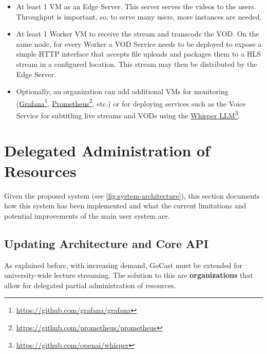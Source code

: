 \begin{itemize}
    \item At least 1 \ac{VM} as an Edge Server. This server serves the videos to the users. Throughput is important, so, to serve many users, more instances are needed.
    \item At least 1 Worker \ac{VM} to receive the stream and transcode the \ac{VOD}. On the same node, for every Worker a VOD Service needs to be deployed to expose a simple HTTP interface that accepts file uploads and packages them to a \ac{HLS} stream in a configured location. This stream may then be distributed by the Edge Server.
    \item Optionally, an organization can add additional \ac{VM}s for monitoring (\href{https://github.com/grafana/grafana}{Grafana}\footnote{\url{https://github.com/grafana/grafana}}, \href{https://github.com/prometheus/prometheus}{Prometheus}\footnote{\url{https://github.com/prometheus/prometheus}}, etc.) or for deploying services such as the Voice Service for subtitling live streams and \ac{VOD}s using the \href{https://github.com/openai/whisper}{Whisper LLM}\footnote{\url{https://github.com/openai/whisper}}.
\end{itemize}


\section{Delegated Administration of Resources}\label{section:rbac}

Given the proposed system (see \autoref{fig:system-architecture}), this section documents how this system has been implemented and what the current limitations and potential improvements of the main user system are. 

\subsection{Updating Architecture and Core API}

As explained before, with increasing demand, GoCast must be extended for university-wide lecture streaming. The solution to this are \textbf{organizations} that allow for delegated partial administration of resources.

